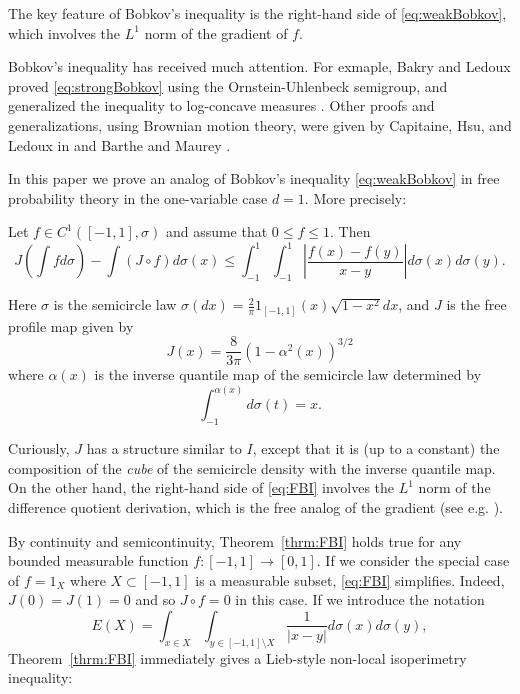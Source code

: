 The key feature of Bobkov's inequality is the right-hand side of \eqref{eq:weakBobkov}, which involves the $L^1$ norm of the gradient of $f$. 

Bobkov's inequality has received much attention. For exmaple, Bakry and Ledoux proved \eqref{eq:strongBobkov} using the Ornstein-Uhlenbeck semigroup, and generalized the inequality to log-concave measures \cite{BakryLedoux1996}.  
Other proofs and generalizations, using Brownian motion theory, were given by Capitaine, Hsu, and Ledoux in \cite{CapitaineHsuLedoux} and  Barthe and Maurey \cite{BartheMaurey}.

In this paper we prove an analog of Bobkov's inequality \eqref{eq:weakBobkov} in free probability theory \cite{VoiculescuDykemaNica,NicaSpeicher} in the one-variable case  $d=1$. More precisely:
\begin{theorem} \label{thrm:FBI}
    Let $f \in C^1([-1,1],\sigma)$  and assume that $0\leq f\leq 1$.  Then \begin{equation}
    \label{eq:FBI}
        J\left(\int f d\sigma \right) - \int (J\circ f) d\sigma (x) \leq \int_{-1}^1 \int_{-1}^1 \left| \frac{f(x)-f(y)}{x-y}\right| d\sigma(x) d\sigma(y).
    \end{equation}
\end{theorem}

Here $\sigma$ is the semicircle law $\sigma(dx)=\frac{2}{\pi} 1_{[-1,1]}(x) \sqrt{1-x^2} dx$, and $J$ is the free profile map given by $$
J(x) = \frac{8}{3\pi}(1-\alpha^2(x))^{3/2}
$$
where $\alpha(x)$ is the inverse quantile map of the semicircle law determined by 
$$
\int_{-1}^{\alpha(x)} d\sigma(t) = x.
$$

Curiously, $J$ has a structure similar to $I$, except that it is (up to a constant) the composition of  the \emph{cube} of the semicircle density with the inverse quantile map.  On the other hand, the right-hand side of \eqref{eq:FBI} involves the $L^1$ norm of the difference quotient derivation, which is the free analog of the gradient (see e.g. \cite{Voiculescu1998}).  

By continuity and semicontinuity, Theorem~\ref{thrm:FBI} holds true for any bounded measurable function $f:[-1,1]\to[0,1]$.  If we consider the special case of $f=1_{X}$ where $X\subset [-1,1]$ is a measurable subset, \eqref{eq:FBI} simplifies. Indeed, $J(0)=J(1)=0$ and so $J\circ f=0$ in this case.  If we introduce the notation $$E(X)=\int_{x\in X} \int_{y\in [-1,1]\setminus X}  \frac{1}{|x-y|} d\sigma(x) d\sigma(y),$$ Theorem~\ref{thrm:FBI} immediately gives a Lieb-style non-local isoperimetry inequality:


